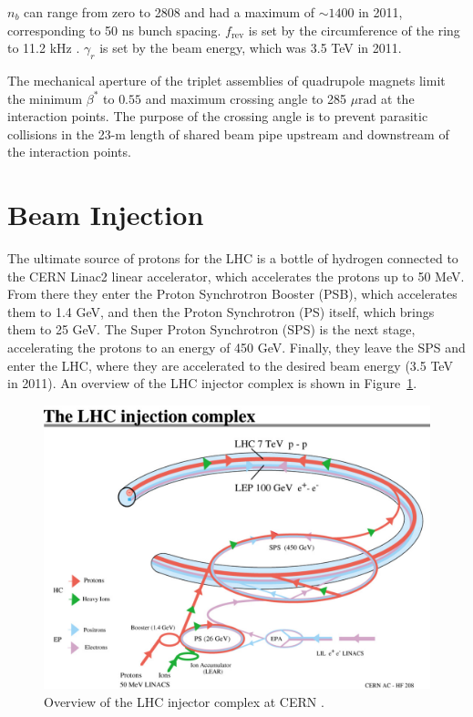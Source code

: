 \documentclass[dissertation.tex]{subfiles}
\begin{document}
$n_{b}$ can range from zero to 2808 and had a maximum of $\sim1400$ in 2011, corresponding to 50 ns bunch spacing.  $f_{\mathrm{rev}}$ is set by the circumference of the ring to 11.2 kHz \cite{LHC_beam_parameters}.  $\gamma_{r}$ is set by the beam energy, which was 3.5 TeV in 2011.

The mechanical aperture of the triplet assemblies of quadrupole magnets limit the minimum $\beta^{*}$ to $0.55$ \cite{LHC_beam_parameters} and maximum crossing angle to 285 $\mu\mbox{rad}$ \cite{LHC_beam_parameters} at the interaction points.  The purpose of the crossing angle is to prevent parasitic collisions in the 23-m length of shared beam pipe upstream and downstream of the interaction points.

\section{Beam Injection}
\label{sec:Beam Injection}

The ultimate source of protons for the LHC is a bottle of hydrogen connected to the CERN Linac2 linear accelerator, which accelerates the protons up to 50 MeV.  From there they enter the Proton Synchrotron Booster (PSB), which accelerates them to 1.4 GeV, and then the Proton Synchrotron (PS) itself, which brings them to 25 GeV.  The Super Proton Synchrotron (SPS) is the next stage, accelerating the protons to an energy of 450 GeV.  Finally, they leave the SPS and enter the LHC, where they are accelerated to the desired beam energy (3.5 TeV in 2011).  An overview of the LHC injector complex is shown in Figure~\ref{fig:LHC_injector_complex}.

\begin{figure}
	\centering
	\includegraphics[scale=0.4]{LHC_injector_complex}
	\caption{Overview of the LHC injector complex at CERN \cite{LHC_injector_complex_photo}.}
	\label{fig:LHC_injector_complex}
\end{figure}
\end{document}
